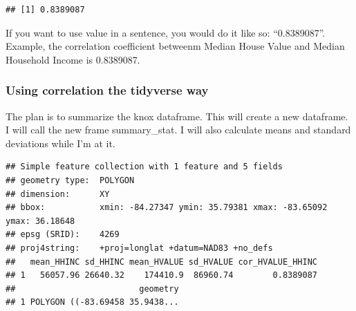 \documentclass[]{article}
\newenvironment{Shaded}{\begin{snugshade}}{\end{snugshade}}
\newcommand{\CommentTok}[1]{\textcolor[rgb]{0.56,0.35,0.01}{\textit{#1}}}
\newcommand{\DataTypeTok}[1]{\textcolor[rgb]{0.13,0.29,0.53}{#1}}
\newcommand{\KeywordTok}[1]{\textcolor[rgb]{0.13,0.29,0.53}{\textbf{#1}}}
\newcommand{\NormalTok}[1]{#1}
\newcommand{\OperatorTok}[1]{\textcolor[rgb]{0.81,0.36,0.00}{\textbf{#1}}}
\newcommand{\OtherTok}[1]{\textcolor[rgb]{0.56,0.35,0.01}{#1}}
\newcommand{\StringTok}[1]{\textcolor[rgb]{0.31,0.60,0.02}{#1}}
\begin{document}
\begin{verbatim}
## [1] 0.8389087
\end{verbatim}

If you want to use value in a sentence, you would do it like so:
``0.8389087''. Example, the correlation coefficient betweenm Median
House Value and Median Household Income is 0.8389087.

\hypertarget{using-correlation-the-tidyverse-way}{%
\subsubsection{Using correlation the tidyverse
way}\label{using-correlation-the-tidyverse-way}}

The plan is to summarize the knox dataframe. This will create a new
dataframe. I will call the new frame summary\_stat. I will also
calculate means and standard deviations while I'm at it.

\begin{Shaded}
\end{Shaded}

\begin{verbatim}
## Simple feature collection with 1 feature and 5 fields
## geometry type:  POLYGON
## dimension:      XY
## bbox:           xmin: -84.27347 ymin: 35.79381 xmax: -83.65092 ymax: 36.18648
## epsg (SRID):    4269
## proj4string:    +proj=longlat +datum=NAD83 +no_defs
##   mean_HHINC sd_HHINC mean_HVALUE sd_HVALUE cor_HVALUE_HHINC
## 1   56057.96 26640.32    174410.9  86960.74        0.8389087
##                         geometry
## 1 POLYGON ((-83.69458 35.9438...
\end{verbatim}
\end{document}
